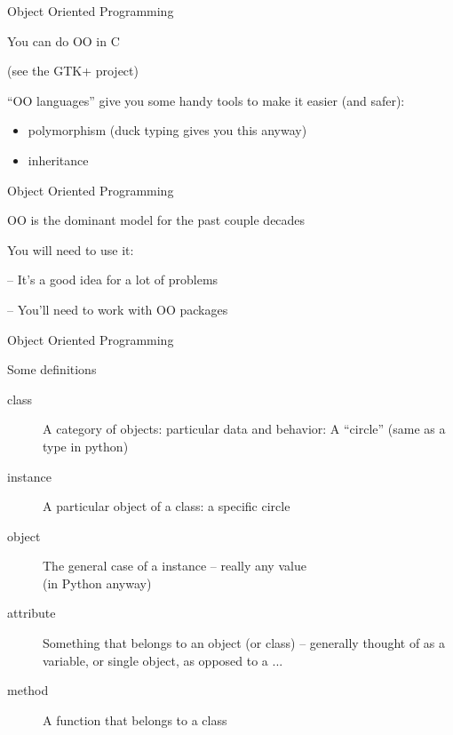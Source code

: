 \documentclass{beamer}
\begin{document}
\begin{frame}[fragile]{Object Oriented Programming}

\vfill
{\LARGE You can do OO in C}

(see the GTK+ project)

\vfill
{\Large 
``OO languages'' give you some handy tools to make it easier (and safer):
}

\vfill
{\Large
\begin{itemize}
  \item polymorphism (duck typing gives you this anyway)
  \item inheritance
\end{itemize}
}
\end{frame} 

\begin{frame}[fragile]{Object Oriented Programming}

\vfill
{\Large OO is the dominant model for the past couple decades

\vfill
You will need to use it:

\vfill
-- It's a good idea for a lot of problems

\vfill
-- You'll need to work with OO packages
}
\end{frame} 

\begin{frame}[fragile]{Object Oriented Programming}

\vfill
{\LARGE Some definitions}

\begin{description}
  \item[class] A category of objects: particular data and behavior: A ``circle'' (same as a type in python)
  \item[instance] A particular object of a class: a specific circle
  \item[object] The general case of a instance -- really any value\\ (in Python anyway)
  \item[attribute] Something that belongs to an object (or class)
    -- generally thought of as a variable, or single object, as opposed to a ...
  \item[method] A function that belongs to a class
\end{description}

\end{frame} 
\end{document}
